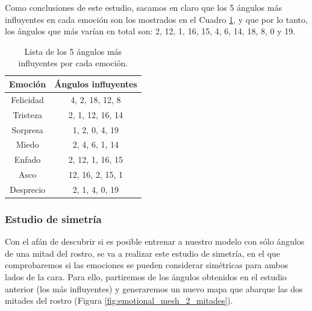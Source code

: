 Como conclusiones de este estudio, sacamos en claro que los 5 ángulos más influyentes en cada emoción son los mostrados en el Cuadro \ref{cuadro:angulos_5_influyentes}, y que por lo tanto, los ángulos que más varían en total son: 2, 12, 1, 16, 15, 4, 6, 14, 18, 8, 0 y 19.\\

\begin{table}[H]
\begin{center}
\begin{tabular}{|c|c|}
     \hline
    \textbf{Emoción} & \textbf{Ángulos influyentes} \\
    \hline
     Felicidad & 4, 2, 18, 12, 8 \\
     Tristeza & 2, 1, 12, 16, 14 \\
     Sorpresa & 1, 2, 0, 4, 19 \\
     Miedo & 2, 4, 6, 1, 14 \\
     Enfado & 2, 12, 1, 16, 15 \\
     Asco & 12, 16, 2, 15, 1 \\
     Desprecio & 2, 1, 4, 0, 19 \\
     \hline
 \end{tabular}
 \captionsetup{justification=centering}
\caption{Lista de los 5 ángulos más influyentes por cada emoción.}
\label{cuadro:angulos_5_influyentes}
\end{center}
\end{table}

\subsubsection{Estudio de simetría}
Con el afán de descubrir si es posible entrenar a nuestro modelo con sólo ángulos de una mitad del rostro, se va a realizar este estudio de simetría, en el que comprobaremos si las emociones se pueden considerar simétricas para ambos lados de la cara. Para ello, partiremos de los ángulos obtenidos en el estudio anterior (los más influyentes) y generaremos un nuevo mapa que abarque las dos mitades del rostro (Figura \ref{fig:emotional_mesh_2_mitades}).\\


